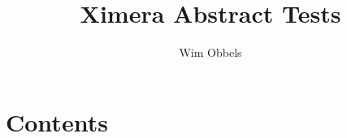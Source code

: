 \documentclass{xourse}
\begin{document}
    \author{Wim Obbels}
    \title{Ximera Abstract Tests}
    \maketitle

\part{Contents}
\end{document}

